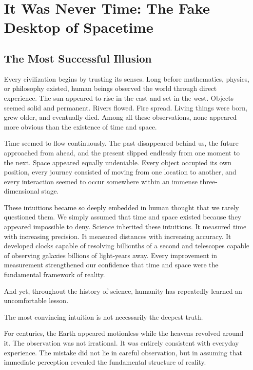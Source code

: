 

\section{It Was Never Time: The Fake Desktop of Spacetime}

\subsection{\textbf{The Most Successful Illusion}}

Every civilization begins by trusting its senses. Long before mathematics, physics, or philosophy existed, human beings observed the world through direct experience. The sun appeared to rise in the east and set in the west. Objects seemed solid and permanent. Rivers flowed. Fire spread. Living things were born, grew older, and eventually died. Among all these observations, none appeared more obvious than the existence of time and space.

Time seemed to flow continuously. The past disappeared behind us, the future approached from ahead, and the present slipped endlessly from one moment to the next. Space appeared equally undeniable. Every object occupied its own position, every journey consisted of moving from one location to another, and every interaction seemed to occur somewhere within an immense three-dimensional stage.

These intuitions became so deeply embedded in human thought that we rarely questioned them. We simply assumed that time and space existed because they appeared impossible to deny. Science inherited these intuitions. It measured time with increasing precision. It measured distances with increasing accuracy. It developed clocks capable of resolving billionths of a second and telescopes capable of observing galaxies billions of light-years away. Every improvement in measurement strengthened our confidence that time and space were the fundamental framework of reality.

And yet, throughout the history of science, humanity has repeatedly learned an uncomfortable lesson.

The most convincing intuition is not necessarily the deepest truth.

For centuries, the Earth appeared motionless while the heavens revolved around it. The observation was not irrational. It was entirely consistent with everyday experience. The mistake did not lie in careful observation, but in assuming that immediate perception revealed the fundamental structure of reality.

